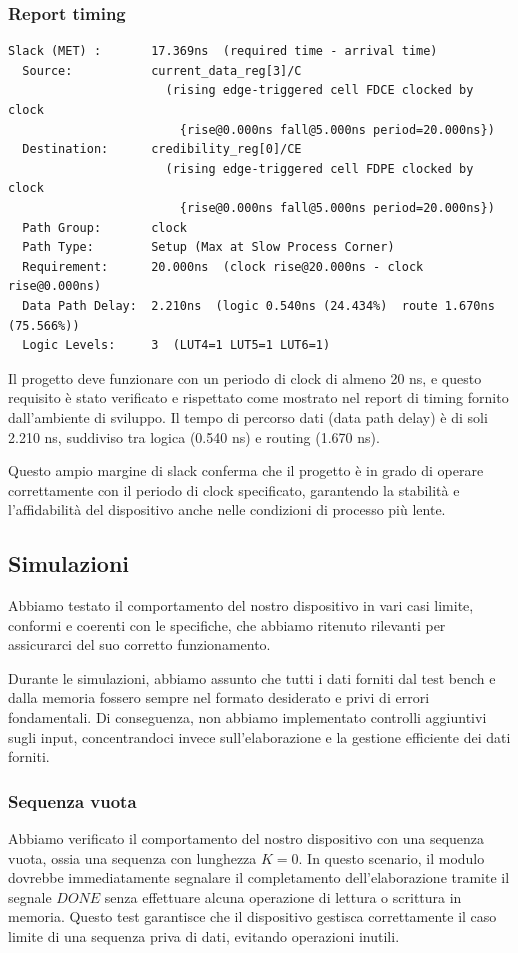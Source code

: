 \subsubsection{Report timing}
\begin{verbatim}
Slack (MET) :       17.369ns  (required time - arrival time)
  Source:           current_data_reg[3]/C
                      (rising edge-triggered cell FDCE clocked by clock  
                        {rise@0.000ns fall@5.000ns period=20.000ns})
  Destination:      credibility_reg[0]/CE
                      (rising edge-triggered cell FDPE clocked by clock  
                        {rise@0.000ns fall@5.000ns period=20.000ns})
  Path Group:       clock
  Path Type:        Setup (Max at Slow Process Corner)
  Requirement:      20.000ns  (clock rise@20.000ns - clock rise@0.000ns)
  Data Path Delay:  2.210ns  (logic 0.540ns (24.434%)  route 1.670ns (75.566%))
  Logic Levels:     3  (LUT4=1 LUT5=1 LUT6=1)
\end{verbatim}
\par Il progetto deve funzionare con un periodo di clock di almeno 20 ns, e questo requisito è stato verificato e rispettato come mostrato nel report di timing fornito dall'ambiente di sviluppo. Il tempo di percorso dati (data path delay) è di soli 2.210 ns, suddiviso tra logica (0.540 ns) e routing (1.670 ns).
\par Questo ampio margine di slack conferma che il progetto è in grado di operare correttamente con il periodo di clock specificato, garantendo la stabilità e l'affidabilità del dispositivo anche nelle condizioni di processo più lente.
\subsection{Simulazioni}
  \par Abbiamo testato il comportamento del nostro dispositivo in vari casi limite, conformi e coerenti con le specifiche, che abbiamo ritenuto rilevanti per assicurarci del suo corretto funzionamento.
  \par Durante le simulazioni, abbiamo assunto che tutti i dati forniti dal test bench e dalla memoria fossero sempre nel formato desiderato e privi di errori fondamentali. Di conseguenza, non abbiamo implementato controlli aggiuntivi sugli input, concentrandoci invece sull'elaborazione e la gestione efficiente dei dati forniti. 
\subsubsection{Sequenza vuota}
  Abbiamo verificato il comportamento del nostro dispositivo con una sequenza vuota, ossia una sequenza con lunghezza $K=0$.
  In questo scenario, il modulo dovrebbe immediatamente segnalare il completamento dell'elaborazione tramite il segnale $DONE$ senza effettuare alcuna operazione di lettura o scrittura in memoria.
  Questo test garantisce che il dispositivo gestisca correttamente il caso limite di una sequenza priva di dati, evitando operazioni inutili.
